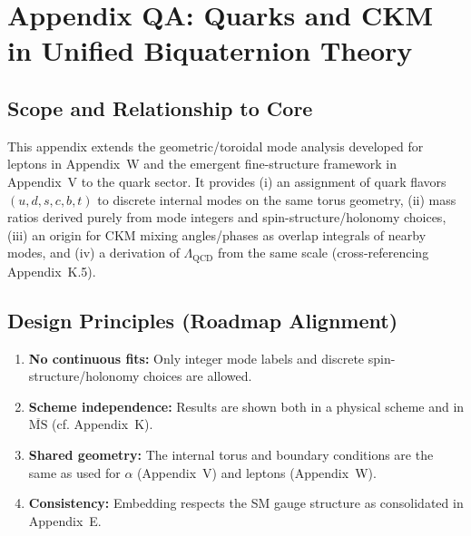 \appendix
\section*{Appendix QA: Quarks and CKM in Unified Biquaternion Theory}

\subsection*{Scope and Relationship to Core}
This appendix extends the geometric/toroidal mode analysis developed for leptons in Appendix~W
and the emergent fine-structure framework in Appendix~V to the quark sector.
It provides (i) an assignment of quark flavors $(u,d,s,c,b,t)$ to discrete internal modes
on the same torus geometry, (ii) mass ratios derived purely from mode integers and spin-structure/holonomy choices,
(iii) an origin for CKM mixing angles/phases as overlap integrals of nearby modes,
and (iv) a derivation of $\Lambda_{\mathrm{QCD}}$ from the same scale (cross-referencing Appendix~K.5).

\subsection*{Design Principles (Roadmap Alignment)}
\begin{enumerate}
  \item \textbf{No continuous fits:} Only integer mode labels and discrete spin-structure/holonomy choices are allowed.
  \item \textbf{Scheme independence:} Results are shown both in a physical scheme and in $\overline{\mathrm{MS}}$ (cf. Appendix~K).
  \item \textbf{Shared geometry:} The internal torus and boundary conditions are the same as used for $\alpha$ (Appendix~V) and leptons (Appendix~W).
  \item \textbf{Consistency:} Embedding respects the SM gauge structure as consolidated in Appendix~E.
\end{enumerate}

